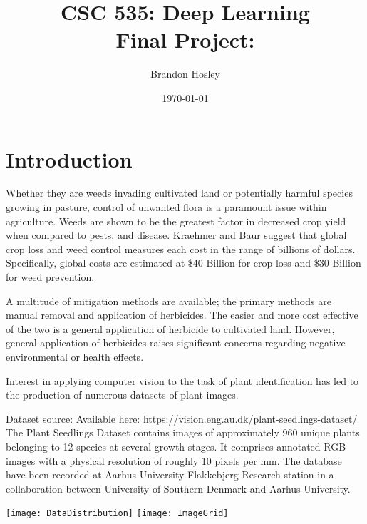\documentclass[]{article}
\title{CSC 535: Deep Learning \\ Final Project: \\ }
\author{Brandon Hosley}
\date{\today}
\begin{document}
	\maketitle
	\clearpage
	
\begin{abstract}
	
\end{abstract}
	
\section{Introduction} 

Whether they are weeds invading cultivated land or potentially harmful species growing in pasture, control of unwanted flora is a paramount issue within agriculture.
Weeds are shown to be the greatest factor in decreased crop yield when compared to pests, and disease.
\cite{Oerke2006}
\cite{Rao2000}
\cite{Gianessi2007}
Kraehmer and Baur \cite{WeedAnatomy2013}
suggest that global crop loss and weed control measures each cost in the range of billions of dollars.
Specifically, global costs are estimated at 
\$40 Billion \cite{Monaco2002} for crop loss and 
\$30 Billion \cite{Lawes2008} for weed prevention.

A multitude of mitigation methods are available; 
the primary methods are manual removal and application of herbicides.
The easier and more cost effective of the two is a general application of herbicide to cultivated land.
However, general application of herbicides raises significant concerns regarding negative environmental or health effects. 
\cite{Sopena2009}






Interest in applying computer vision to the task of plant identification has led to the production of numerous datasets of plant images.
\cite{Sudars2020}




Dataset source:
Available here: https://vision.eng.au.dk/plant-seedlings-dataset/
\cite{Giselsson2017}
The Plant Seedlings Dataset contains images of approximately 960 unique plants belonging to 12 species at several growth stages.
It comprises annotated RGB images with a physical resolution of roughly 10 pixels per mm.
The database have been recorded at Aarhus University Flakkebjerg Research station in a collaboration between University of Southern Denmark and Aarhus University.


\texttt{[image: DataDistribution]}
\texttt{[image: ImageGrid]}
\end{document}
